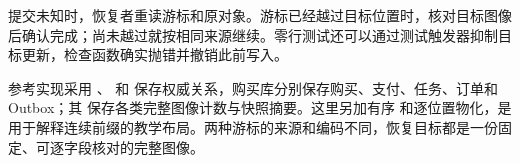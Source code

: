 提交未知时，恢复者重读游标和原对象。游标已经越过目标位置时，核对目标图像后确认完成；尚未越过就按相同来源继续。零行测试还可以通过测试触发器抑制目标更新，检查函数确实抛错并撤销此前写入。

参考实现采用 、 和  保存权威关系，购买库分别保存购买、支付、任务、订单和 Outbox；其  保存各类完整图像计数与快照摘要。这里另加有序  和逐位置物化，是用于解释连续前缀的教学布局。两种游标的来源和编码不同，恢复目标都是一份固定、可逐字段核对的完整图像。
